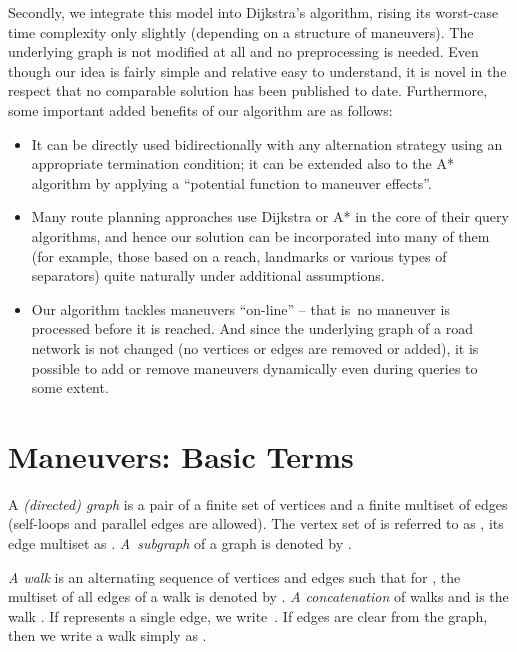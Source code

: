 \documentclass[envcountsect,envcountsame]{llncs}
\begin{document}
Secondly, we integrate this model into Dijkstra's algorithm, rising its 
worst-case time complexity only slightly (depending on a structure of 
maneuvers). The underlying graph is not modified at all and no preprocessing 
is needed. Even though our idea is fairly simple and relative easy to 
understand, it is novel in the respect that no comparable solution has been 
published to date. Furthermore, some important added benefits of our 
algorithm are as follows:

\begin{itemize}
\parskip 2pt
\item It can be directly used bidirectionally with any alternation strategy
  using an appropriate termination condition; it can be extended also to the 
  A* algorithm by applying a ``potential function to maneuver effects''.
  
\item Many route planning approaches use Dijkstra or A* in the core of their 
  query algorithms, and hence our solution can be incorporated into many of 
  them (for example, those based on a reach, landmarks or various types of 
  separators) quite naturally under additional assumptions.

\item Our algorithm tackles maneuvers ``on-line'' -- that is\ no maneuver 
  is processed before it is reached. And since the underlying graph of a 
  road network is not changed (no vertices or edges are removed or added),
  it is possible to add or remove maneuvers dynamically even during queries
  to some extent.
\end{itemize}

\section{Maneuvers: Basic Terms}
\label{sec:maneuvers}

A \emph{(directed) graph}  is a pair of a finite set  of vertices 
and a finite multiset  of edges (self-loops and 
parallel edges are allowed). The vertex set of  is referred to as , 
its edge multiset as . \emph{A~subgraph}  of a graph  is denoted 
by . 

\emph{A walk}  is an alternating sequence of vertices and 
edges   such that  for , the multiset of all edges of a walk 
is denoted by . \emph{A concatenation}  of 
walks  and  is the walk  . 
If  represents a single edge, we write~. If edges are 
clear from the graph, then we write a walk simply as .
\end{document}
